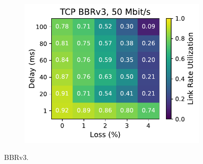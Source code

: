 \begin{figure}[ht]
\begin{subfigure}[b]{0.89cm}
        \includegraphics[width=\linewidth,trim={8cm 0 0 0},clip]{splitting/figures/heatmaps/heatmap_tcp_bbr3_50mbps.pdf}
        \vspace*{0.2cm}
    \end{subfigure}
    \caption{BBRv3.}
\end{figure}

